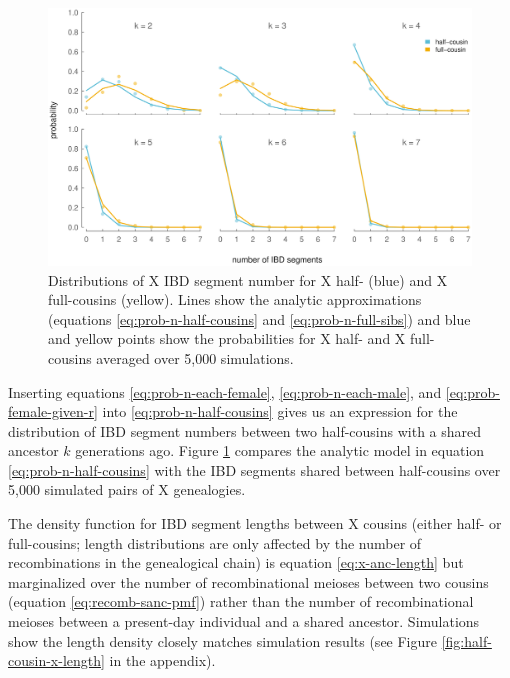 \documentclass[9pt,twocolumn,twoside]{gsajnl}
\begin{document}
\begin{figure}[!ht]
  \centering

  \includegraphics[width=\textwidth]{images/x-full-half-blockcounts}

  \caption{Distributions of X IBD segment number for X half- (blue) and X
full-cousins (yellow). Lines show the analytic approximations (equations
\eqref{eq:prob-n-half-cousins} and \eqref{eq:prob-n-full-sibs}) and blue and
yellow points show the probabilities for X half- and X full-cousins averaged
over 5,000 simulations.}

  \label{fig:half-cousin-segment-number}
\end{figure}

Inserting equations \eqref{eq:prob-n-each-female}, \eqref{eq:prob-n-each-male},
and \eqref{eq:prob-female-given-r} into \eqref{eq:prob-n-half-cousins} gives us
an expression for the distribution of IBD segment numbers between two
half-cousins with a shared ancestor $k$ generations ago. Figure
\ref{fig:half-cousin-segment-number} compares the analytic model in equation
\eqref{eq:prob-n-half-cousins} with the IBD segments shared between
half-cousins over 5,000 simulated pairs of X genealogies.

The density function for IBD segment lengths between X cousins (either half- or
full-cousins; length distributions are only affected by the number of
recombinations in the genealogical chain) is equation \eqref{eq:x-anc-length}
but marginalized over the number of recombinational meioses between two cousins
(equation \eqref{eq:recomb-sanc-pmf}) rather than the number of recombinational
meioses between a present-day individual and a shared ancestor. Simulations
show the length density closely matches simulation results (see Figure
\ref{fig:half-cousin-x-length} in the appendix).
\end{document}
